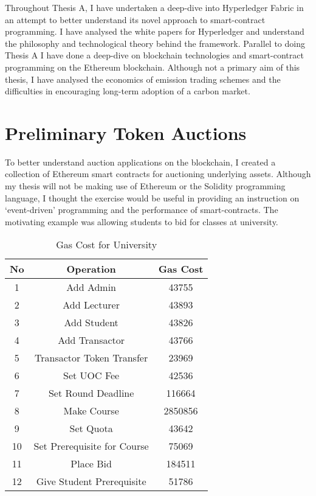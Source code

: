 Throughout Thesis A, I have undertaken a
deep-dive into Hyperledger Fabric in an attempt to better understand
its novel approach to smart-contract programming. I have analysed the
white papers for Hyperledger and understand the philosophy and
technological theory behind the framework. Parallel to doing
Thesis A I have done a deep-dive on blockchain technologies and
smart-contract programming on the Ethereum blockchain.
Although not a primary aim of this thesis, I have analysed
the economics of emission trading schemes and the difficulties
in encouraging long-term adoption of a carbon market.

\section{Preliminary Token Auctions}
To better understand auction applications on the blockchain, I
created a collection of Ethereum smart contracts for auctioning
underlying assets. Although my thesis
will not be making use of Ethereum or the Solidity programming
language, I thought the exercise would be useful
in providing an instruction on `event-driven' programming and
the performance of smart-contracts. The motivating example
was allowing students to bid for classes at university.

\begin{table}[H]
    \centering
    \begin{tabular}{||c c c ||}
        \hline
        No & Operation                   & Gas Cost \\ [0.5ex]
        \hline\hline
        1  & Add Admin                   & 43755    \\
        \hline
        2  & Add Lecturer                & 43893    \\
        \hline
        3  & Add Student                 & 43826    \\
        \hline
        4  & Add Transactor              & 43766    \\
        \hline
        5  & Transactor Token Transfer   & 23969    \\
        \hline
        6  & Set UOC Fee                 & 42536    \\
        \hline
        7  & Set Round Deadline          & 116664   \\
        \hline
        8  & Make Course                 & 2850856  \\
        \hline
        9  & Set Quota                   & 43642    \\
        \hline
        10 & Set Prerequisite for Course & 75069    \\
        \hline
        11 & Place Bid                   & 184511   \\
        \hline
        12 & Give Student Prerequisite   & 51786    \\ [1ex]
        \hline
    \end{tabular}
    \caption{Gas Cost for University}
    \label{tab:gascost}
\end{table}

